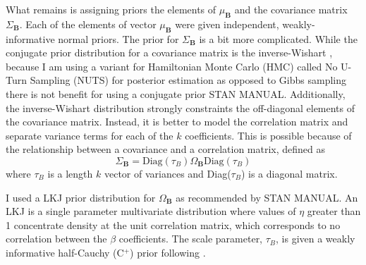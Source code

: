 \documentclass[12pt,letterpaper]{article}
\begin{document}
What remains is assigning priors the elements of \(\mu_{\mathbf{B}}\) and the covariance matrix \(\Sigma_{\mathbf{B}}\). Each of the elements of vector \(\mu_{\mathbf{B}}\) were given independent, weakly-informative normal priors. The prior for \(\Sigma_{\mathbf{B}}\) is a bit more complicated. While the conjugate prior distribution for a covariance matrix is the inverse-Wishart \citep{Gelman2013d}, because I am using a variant for Hamiltonian Monte Carlo (HMC) called No U-Turn Sampling (NUTS) for posterior estimation as opposed to Gibbs sampling there is not benefit for using a conjugate prior \uppercase{stan manual}. Additionally, the inverse-Wishart distribution strongly constraints the off-diagonal elements of the covariance matrix. Instead, it is better to model the correlation matrix and separate variance terms for each of the \(k\) coefficients. This is possible because of the relationship between a covariance and a correlation matrix, defined as 
\begin{equation}
  \Sigma_{\mathbf{B}} = \text{Diag}(\tau_{B}) \Omega_{\mathbf{B}} \text{Diag}(\tau_{B})
  \label{eq:covcor}
\end{equation}
where \(\tau_{B}\) is a length \(k\) vector of variances and Diag(\(\tau_{B}\)) is a diagonal matrix.

I used a LKJ prior distribution for \(\Omega_{\mathbf{B}}\) as recommended by \uppercase{stan manual}. An LKJ is a single parameter multivariate distribution where values of \(\eta\) greater than 1 concentrate density at the unit correlation matrix, which corresponds to no correlation between the \(\beta\) coefficients. The scale parameter, \(\tau_{B}\), is given a weakly informative half-Cauchy (C\(^{+}\)) prior following \citet{Gelman2006a}.
\end{document}
